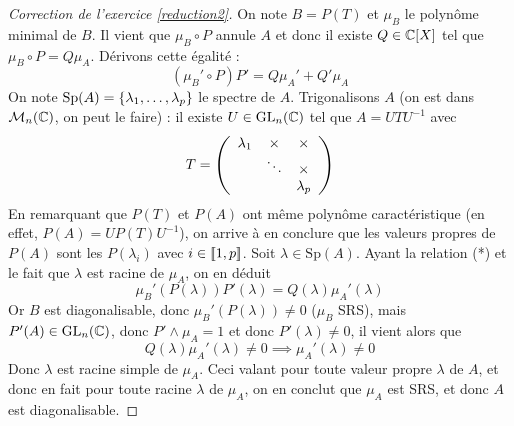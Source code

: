 \begin{proof}[Correction de l'exercice \ref{reduction2}]
	On note $B=P(T)$ et $\mu_B$ le polynôme minimal de $B$. Il vient que $\mu_B\circ P$ annule $A$ et donc il existe $Q\in\operatorname{\mathbb C}[X]$ tel que $\mu_B\circ P=Q\mu_A$. Dérivons cette égalité : \[(\mu_B'\circ P)P'=Q\mu_A'+Q'\mu_A\tag{*}\]
	On note $\operatorname{Sp}(A)=\lbrace \lambda_1,\dots,\lambda_p\rbrace$ le spectre de $A$. 
    Trigonalisons $A$ (on est dans $\mathcal M_n(\operatorname{\mathbb C})$, on peut le faire) : il existe $U\in \operatorname{GL}_n(\operatorname{\mathbb C})$ tel que $A=UTU^{-1}$ avec 
	\[
		T = \left( \begin{array}{c c c} \lambda_1 & \times & \times\\ & \ddots & \times \\ & & \lambda_p\end{array} \right)
	\]
	En remarquant que $P(T)$ et $P(A)$ ont même polynôme caractéristique (en effet, $P(A)=UP(T)U^{-1}$), on arrive à en conclure que les valeurs propres de $P(A)$ sont les $P(\lambda_i)$ avec $i\in[\![1,p]\!]$. Soit $\lambda\in\text{Sp}(A)$. Ayant la relation (*) et le fait que $\lambda$ est racine de $\mu_A$, on en déduit \[\mu_B'(P(\lambda))P'(\lambda)=Q(\lambda)\mu_A'(\lambda)\]
	Or $B$ est diagonalisable, donc $\mu_B'(P(\lambda))\neq 0$ ($\mu_B$ SRS), mais $P'(A)\in \operatorname{GL}_n(\operatorname{\mathbb C})$, donc $P'\wedge \mu_A=1$ et donc $P'(\lambda)\neq 0$, il vient alors que \[Q(\lambda)\mu_A'(\lambda)\neq 0 \implies \mu_A'(\lambda)\neq 0\]
	Donc $\lambda$ est racine simple de $\mu_A$. Ceci valant pour toute valeur propre $\lambda$ de $A$, et donc en fait pour toute racine $\lambda$ de $\mu_A$, on en conclut que $\mu_A$ est SRS, et donc $A$ est diagonalisable.
\end{proof}

